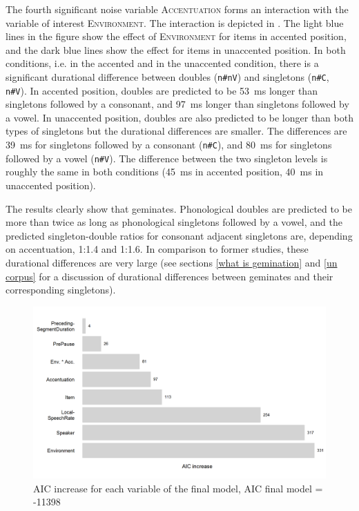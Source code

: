 The fourth significant noise variable \textsc{Accentuation} forms an interaction with the variable of interest \textsc{Environment}. The interaction is depicted in .
The light blue lines in the figure show the effect of \textsc{Environment} for items in accented position, and the dark blue lines show the effect for items in unaccented position. In both conditions, i.e. in the accented and in the unaccented condition, there is a significant durational difference between doubles (\texttt{n\#nV}) and singletons (\texttt{n\#C}, \texttt{n\#V}). 
 In accented position, doubles are predicted to be 53~ms longer than singletons followed by a consonant, and 97~ms longer than singletons followed by a vowel. 
 In unaccented position, doubles are also predicted to be longer than both types of singletons but the durational differences are smaller. The differences are 39~ms  for singletons followed by a consonant (\texttt{n\#C}), and 80~ms for singletons followed by a vowel (\texttt{n\#V}). The difference between the two singleton levels is roughly the same in both conditions (45~ms in accented position, 40~ms in unaccented position).




 The results clearly show that  geminates. Phonological doubles are predicted to be more than twice as long as phonological singletons followed by a vowel, and the predicted singleton-double ratios for consonant adjacent singletons are, depending on accentuation, 1:1.4 and 1:1.6. In comparison to former studies, these durational differences are very large (see sections \ref{what is gemination} and \ref{un corpus} for a discussion of durational differences between geminates and their corresponding singletons). 




\begin{figure}[t!]
	\centering
	
	\includegraphics[scale=0.7] {images/Experiment/AICdecreaseUnComplex.png}


	\caption{AIC increase for each variable of the final model, AIC final model = -11398}
	\label{fig:Effect sozed un Exp unV vs Unn}

\end{figure}



